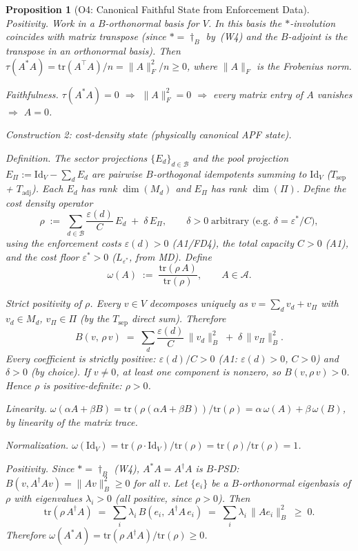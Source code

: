 \documentclass[11pt,a4paper]{article}
\newtheorem{proposition}[theorem]{Proposition}
\theoremstyle{definition}
\newcommand{\eps}{\varepsilon}
\newcommand{\tr}{\mathrm{tr}}
\begin{document}
\begin{proposition}[O4: Canonical Faithful State from Enforcement Data]
\noindent\textit{Positivity.}  Work in a $B$-orthonormal basis for $V$.  In this basis the $*$-involution coincides with matrix transpose (since $* = \dagger_B$ by~(W4) and the $B$-adjoint is the transpose in an orthonormal basis).  Then $\tau(A^*A) = \tr(A^\top A)/n = \|A\|_F^2/n \ge 0$, where $\|A\|_F$ is the Frobenius norm.

\noindent\textit{Faithfulness.}  $\tau(A^*A) = 0$ $\Rightarrow$ $\|A\|_F^2 = 0$ $\Rightarrow$ every matrix entry of $A$ vanishes $\Rightarrow$ $A = 0$.

\medskip\noindent\textit{Construction 2: cost-density state (physically canonical APF state).}

\smallskip\noindent\textit{Definition.}  The sector projections $\{E_d\}_{d \in \mathcal{B}}$ and the pool projection $E_\Pi := \mathrm{Id}_V - \sum_d E_d$ are pairwise $B$-orthogonal idempotents summing to $\mathrm{Id}_V$ ($T_{\mathrm{sep}}$ + $T_{\mathrm{adj}}$).  Each $E_d$ has rank $\dim(M_d)$ and $E_\Pi$ has rank $\dim(\Pi)$.  Define the \emph{cost density operator}
\[
\rho \;:=\; \sum_{d \in \mathcal{B}} \frac{\eps(d)}{C}\,E_d \;+\; \delta\, E_\Pi, \qquad \delta > 0\;\text{arbitrary (e.g.\ } \delta = \eps^*/C\text{)},
\]
using the enforcement costs $\eps(d) > 0$ (A1/FD4), the total capacity $C > 0$ (A1), and the cost floor $\eps^* > 0$ ($L_{\eps^*}$, from MD).  Define
\[
\omega(A) \;:=\; \frac{\tr(\rho\,A)}{\tr(\rho)}, \qquad A \in \mathcal{A}.
\]

\noindent\textit{Strict positivity of $\rho$.}  Every $v \in V$ decomposes uniquely as $v = \sum_d v_d + v_\Pi$ with $v_d \in M_d$, $v_\Pi \in \Pi$ (by the $T_{\mathrm{sep}}$ direct sum).  Therefore
\[
B(v,\, \rho\, v) \;=\; \sum_d \frac{\eps(d)}{C}\,\|v_d\|_B^2 \;+\; \delta\,\|v_\Pi\|_B^2.
\]
Every coefficient is strictly positive: $\eps(d)/C > 0$ (A1: $\eps(d) > 0$, $C > 0$) and $\delta > 0$ (by choice).  If $v \ne 0$, at least one component is nonzero, so $B(v, \rho\,v) > 0$.  Hence $\rho$ is positive-definite: $\rho > 0$.

\noindent\textit{Linearity.}  $\omega(\alpha A + \beta B) = \tr(\rho(\alpha A + \beta B))/\tr(\rho) = \alpha\,\omega(A) + \beta\,\omega(B)$, by linearity of the matrix trace.

\noindent\textit{Normalization.}  $\omega(\mathrm{Id}_V) = \tr(\rho \cdot \mathrm{Id}_V)/\tr(\rho) = \tr(\rho)/\tr(\rho) = 1$.

\noindent\textit{Positivity.}  Since $* = \dagger_B$ (W4), $A^*A = A^\dagger A$ is $B$-PSD: $B(v, A^\dagger A v) = \|Av\|_B^2 \ge 0$ for all $v$.  Let $\{e_i\}$ be a $B$-orthonormal eigenbasis of $\rho$ with eigenvalues $\lambda_i > 0$ (all positive, since $\rho > 0$).  Then
\[
\tr(\rho\,A^\dagger A) \;=\; \sum_i \lambda_i\, B(e_i,\, A^\dagger A\, e_i) \;=\; \sum_i \lambda_i\,\|A e_i\|_B^2 \;\ge\; 0.
\]
Therefore $\omega(A^*A) = \tr(\rho\,A^\dagger A)/\tr(\rho) \ge 0$.


\end{proposition}
\end{document}
